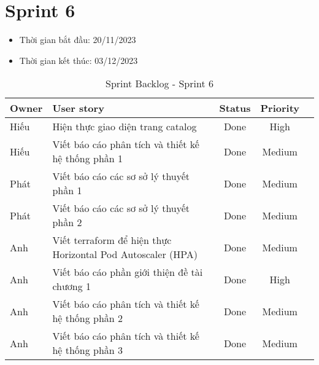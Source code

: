 \section{Sprint 6}
\begin{itemize}
    \item Thời gian bắt đầu: 20/11/2023
    \item Thời gian kết thúc: 03/12/2023
\end{itemize}
\begin{table}[H]
    \begin{tabular}{|m{2.5cm}|m{9cm}|c|c|c|}
    \hline
    \textbf{Owner}  & \textbf{User story}                                & \textbf{Status}  & \textbf{Priority} \\ \hline
    Hiếu               & Hiện thực giao diện trang catalog                    & Done                              & High           \\ \hline
    Hiếu               & Viết báo cáo phân tích và thiết kế hệ thống phần 1                     & Done                              & Medium          \\ \hline
    Phát               & Viết báo cáo các sơ sở lý thuyết phần 1                      & Done                              & Medium          \\ \hline
    Phát                & Viết báo cáo các sơ sở lý thuyết phần 2                     & Done                              & Medium          \\ \hline
    Anh                & Viết terraform để hiện thực Horizontal Pod Autoscaler (HPA)                     & Done                              & Medium          \\ \hline
    Anh                & Viết báo cáo phần giới thiện đề tài chương 1                    & Done                              & High         \\ \hline
    Anh                & Viết báo cáo phân tích và thiết kế hệ thống phần 2                     & Done                              & Medium          \\ \hline
    Anh                & Viết báo cáo phân tích và thiết kế hệ thống phần 3                    & Done                              & Medium          \\ \hline
    \end{tabular}
    \caption{Sprint Backlog - Sprint 6}
    \label{tab:sprint-6}
\end{table}
